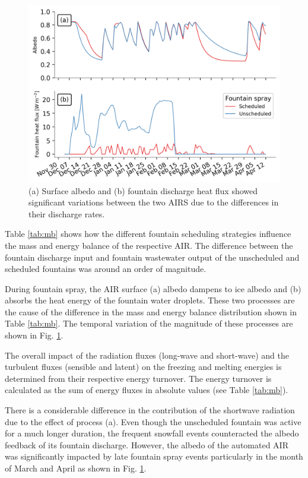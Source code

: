 \documentclass[tc, manuscript]{copernicus}
\begin{document}
\begin{figure}[t]
\includegraphics[width=12cm]{Figures/dis_processes.png}
\caption{(a) Surface albedo  and (b) fountain discharge heat flux showed significant variations between the two
  AIRS due to the differences in their discharge rates.}
\label{fig:dis_processes}
\end{figure}

Table \ref{tab:mb} shows how the different fountain scheduling strategies influence the mass and energy balance
of the respective AIR. The difference between the fountain discharge input and fountain wastewater output of the
unscheduled and scheduled fountains was around an order of magnitude. 

During fountain spray, the AIR surface (a) albedo dampens to ice albedo and (b) absorbs the heat energy of the
fountain water droplets. These two processes are the cause of the difference in the mass and energy balance
distribution shown in Table \ref{tab:mb}. The temporal variation of the magnitude of these processes are shown
in Fig. \ref{fig:dis_processes}. 

The overall impact of the radiation fluxes (long-wave and short-wave) and the turbulent fluxes (sensible and
latent) on the freezing and melting energies is determined from their respective energy turnover. The energy
turnover is calculated as the sum of energy fluxes in absolute values (see Table \ref{tab:mb}). 

There is a considerable difference in the contribution of the shortwave radiation due to the effect of process
(a). Even though the unscheduled fountain was active for a much longer duration, the frequent snowfall events
counteracted the albedo feedback of its fountain discharge. However, the albedo of the automated AIR was
significantly impacted by late fountain spray events particularly in the month of March and April as shown in
Fig. \ref{fig:dis_processes}.
\end{document}
